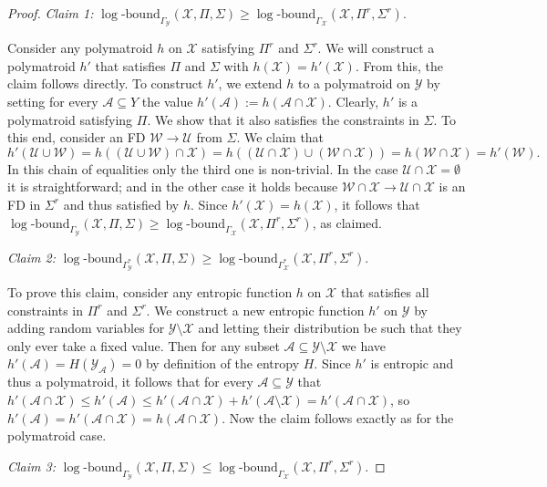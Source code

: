 \documentclass[10pt,a4paper]{amsart}
\newcommand{\logb}{\mathrm{\log\text{-}bound}}
\newcommand{\vset}[1]{\mathcal{#1}}
\begin{document}
\begin{proof}
\emph{Claim 1:}	 $\logb_{\Gamma_{\vset Y}}(\vset X, \Pi, \Sigma) \ge \logb_{\Gamma_{\vset X}}(\vset X, \Pi^r, \Sigma^r)$. 

Consider any polymatroid $h$ on $\vset X$ satisfying $\Pi^r$ and $\Sigma^r$. We will construct a polymatroid $h'$ that satisfies $\Pi$ and $\Sigma$ with $h(\vset X)= h'(\vset X)$. From this, the claim follows directly. To construct $h'$, we extend $h$ to a polymatroid on $\vset Y$ by setting for every $\vset A\subseteq Y$ the value $h'(\vset A) := h(\vset A\cap \vset X)$. Clearly, $h'$ is a polymatroid satisfying $\Pi$. We show that it also satisfies the constraints in $\Sigma$. To this end, consider an FD $\vset W\rightarrow \vset U$ from $\Sigma$. We claim that
\[
h'(\vset U\cup \vset W) = h((\vset U\cup \vset W)\cap \vset X) = h((\vset U\cap \vset X)\cup (\vset W\cap \vset X)) = h(\vset W\cap \vset X) = h'(\vset W).
\] 
In this chain of equalities only the third one is non-trivial. In the case $\vset U \cap \vset X = \emptyset$ it is straightforward; 
and in the other case it
holds because $\vset W \cap \vset X \rightarrow \vset U\cap \vset X$ is an FD in $\Sigma^r$ and thus satisfied by $h$. 
Since $h'(\vset X) = h(\vset X)$, it follows that $\logb_{\Gamma_{\vset Y}}(\vset X, \Pi, \Sigma) \ge \logb_{\Gamma_{\vset X}}(\vset X, \Pi^r, \Sigma^r)$, as claimed.


\smallskip
	 
\emph{Claim 2:} $\logb_{\Gamma^*_{\vset Y}}(\vset X, \Pi, \Sigma) \ge \logb_{\Gamma^*_{\vset X}}(\vset X, \Pi^r, \Sigma^r)$. 

To prove this claim, consider any entropic function $h$ on $\vset X$ that satisfies all constraints in $\Pi^r$ and $\Sigma^r$. We construct a new entropic function $h'$ on $\vset Y$ by adding random variables for $\vset Y\setminus \vset X$ and letting their distribution be such that they only ever take a fixed value. Then for any subset $\vset A\subseteq \vset Y\setminus \vset X$ we have $h'(\vset A) = H(\vset Y_{\vset A}) = 0$ by definition of the entropy $H$. Since $h'$ is entropic and thus a polymatroid, it follows that for every $\vset A\subseteq \vset Y$ that $h'(\vset A\cap \vset X) \le h'(\vset A) \le h'(\vset A\cap \vset X) + h'(\vset A\setminus \vset X) = h'(\vset A\cap \vset X)$, so $h'(\vset A) = h'(\vset A \cap \vset X) = h(\vset A\cap \vset X)$. Now the claim follows exactly as for the polymatroid case.
	
\smallskip
	 
\emph{Claim 3:}
$\logb_{\Gamma_{\vset Y}}(\vset X, \Pi, \Sigma) \le \logb_{\Gamma_{\vset X}}(\vset X, \Pi^r, \Sigma^r)$.


\end{proof}
\end{document}
